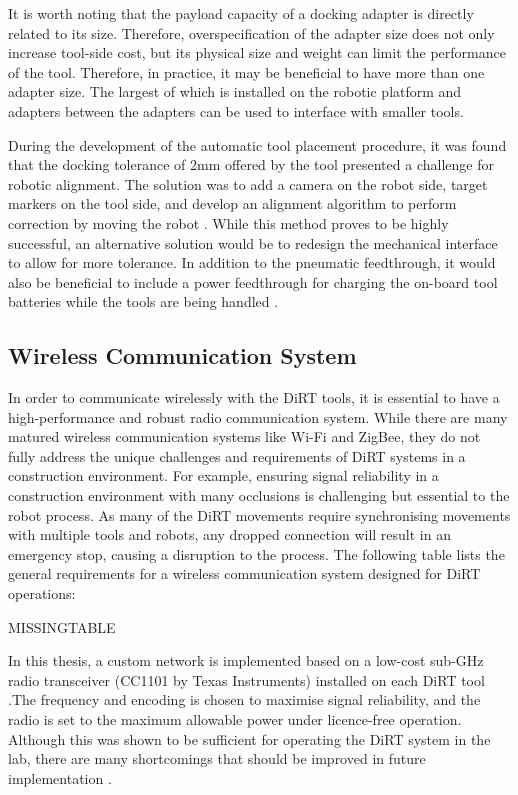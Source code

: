 It is worth noting that the payload capacity of a docking adapter is directly related to its size. Therefore, overspecification of the adapter size does not only increase tool-side cost, but its physical size and weight can limit the performance of the tool. Therefore, in practice, it may be beneficial to have more than one adapter size. The largest of which is installed on the robotic platform and adapters between the adapters can be used to interface with smaller tools.

During the development of the automatic tool placement procedure, it was found that the docking tolerance of 2mm offered by the tool presented a challenge for robotic alignment. The solution was to add a camera on the robot side, target markers on the tool side, and develop an alignment algorithm to perform correction by moving the robot . While this method proves to be highly successful, an alternative solution would be to redesign the mechanical interface to allow for more tolerance. In addition to the pneumatic feedthrough, it would also be beneficial to include a power feedthrough for charging the on-board tool batteries while the tools are being handled . 

\subsection{Wireless Communication System}
\label{subsection:discussion-wireless-communication-system}

In order to communicate wirelessly with the DiRT tools, it is essential to have a high-performance and robust radio communication system. While there are many matured wireless communication systems like Wi-Fi and ZigBee, they do not fully address the unique challenges and requirements of DiRT systems in a construction environment. For example, ensuring signal reliability in a construction environment with many occlusions is challenging but essential to the robot process. As many of the DiRT movements require synchronising movements with multiple tools and robots, any dropped connection will result in an emergency stop, causing a disruption to the process. The following table lists the general requirements for a wireless communication system designed for DiRT operations:

MISSINGTABLE

In this thesis, a custom network is implemented based on a low-cost sub-GHz radio transceiver (CC1101 by Texas Instruments) installed on each DiRT tool .The frequency and encoding is chosen to maximise signal reliability, and the radio is set to the maximum allowable power under licence-free operation. Although this was shown to be sufficient for operating the DiRT system in the lab, there are many shortcomings that should be improved in future implementation .

